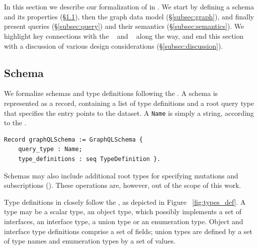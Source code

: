 \section{\gcoql}\label{sec:form}

In this section we describe our formalization of \gql in \coq. We start by defining a schema and its properties (\S\ref{subsec:schema}), then the graph data model (\S\ref{subsec:graph}), and finally present queries (\S\ref{subsec:query}) and their semantics (\S\ref{subsec:semantics}). We highlight key connections with the \spec~\cite{gqlspec} and \HP~\cite{gqlph} along the way, and end this section with a discussion of various design considerations (\S\ref{subsec:discussion}).



\subsection{Schema}\label{subsec:schema}
We formalize schemas and type definitions following the \spec. A
schema is represented as a record, containing a list of type
definitions and a root query type that specifies the entry points to the
dataset. A \texttt{Name} is simply a string, according to the \spec.
%

\begin{verbatim}
Record graphQLSchema := GraphQLSchema {
    query_type : Name;
    type_definitions : seq TypeDefinition }.
\end{verbatim}
%
Schemas may also include additional root types for specifying
mutations and subscriptions (\cf \cite[\S3.2.1]{gqlspec}). These operations are, however, out of the scope of this work.

Type definitions in \gcoql closely follow the \spec, as
depicted in Figure~ \ref{fig:types_def}. A type may be a scalar type,
an object type, which possibly implements a set of interfaces, an
interface type, a union type or an enumeration type. Object and
interface type definitions comprise a set of fields; union
types are defined by a set of type names and enumeration types by a
set of values. 

